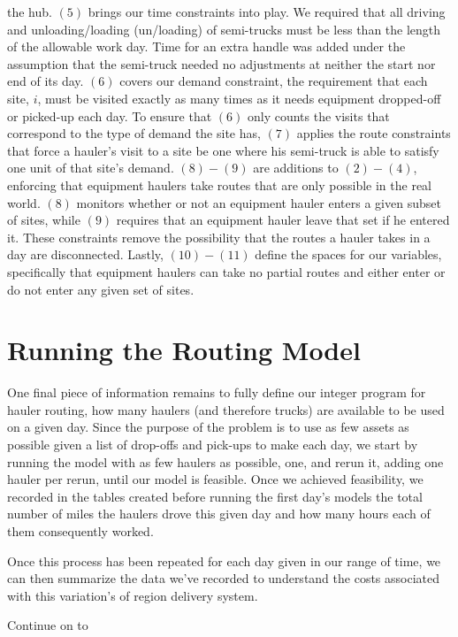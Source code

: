 \documentclass[letterpaper,10pt,english]{sphinxmanual}
\begin{document}
the hub. \((5)\) brings our time constraints into play. We required that
all driving and unloading/loading (un/loading) of semi-trucks must be less
than the length of the allowable work day. Time for an extra handle was added
under the assumption that the semi-truck needed no adjustments at neither the
start nor end of its day. \((6)\) covers our demand
constraint, the requirement that each site, \(i\), must be visited exactly
as many times as it needs equipment dropped-off or picked-up each
day. To ensure that \((6)\) only counts the visits that correspond to the
type of demand the site has, \((7)\) applies the route constraints that
force a hauler's visit to a site be one where his semi-truck is able to
satisfy one unit of that site's demand. \((8)-(9)\) are additions to
\((2)-(4)\), enforcing that equipment haulers take routes that are only
possible in the real world. \((8)\) monitors whether or not an equipment
hauler enters a given subset of sites, while \((9)\) requires that an
equipment hauler leave that set if he entered it. These constraints remove
the possibility that the routes a hauler takes in a day are disconnected.
Lastly, \((10)-(11)\) define the spaces for our variables, specifically
that equipment haulers can take no partial routes and either enter or do not
enter any given set of sites.


\section{Running the Routing Model}
\label{\detokenize{daily-routing:running-the-routing-model}}
One final piece of information remains to fully define our integer program
for hauler routing, how many haulers (and therefore trucks) are available
to be used on a given day. Since the purpose of the problem is to use as few
assets as possible given a list of drop-offs and pick-ups to make each day,
we start by running the model with as few haulers as possible, one, and rerun
it, adding one hauler per rerun, until our model is feasible. Once we achieved
feasibility, we recorded in the tables created before running the first day's
models the total number of miles the haulers drove this given day and how
many hours each of them consequently worked.

Once this process has been repeated for each day given in our range of time,
we can then summarize the data we've recorded to understand the costs
associated with this variation's of region delivery system.

Continue on to {\hyperref[\detokenize{reporting:reporting}]{}}
\end{document}
